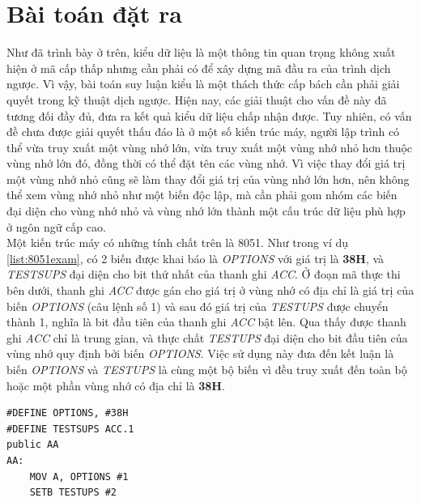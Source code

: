 \section{Bài toán đặt ra}
\label{sec:problem}
Như đã trình bày ở trên, kiểu dữ liệu là một thông tin quan trọng không xuất hiện ở mã cấp thấp nhưng cần phải có để xây dựng mã đầu ra của trình dịch ngược. Vì vậy, bài toán suy luận kiểu là một thách thức cấp bách cần phải giải quyết trong kỹ thuật dịch ngược. Hiện nay, các giải thuật cho vấn đề này đã tương đối đầy đủ, đưa ra kết quả kiểu dữ liệu chấp nhận được. Tuy nhiên, có vấn đề chưa được giải quyết thấu đáo là ở một số kiến trúc máy, người lập trình có thể vừa truy xuất một vùng nhớ lớn, vừa truy xuất một vùng nhớ nhỏ hơn thuộc vùng nhớ lớn đó, đồng thời có thể đặt tên các vùng nhớ. Vì việc thay đổi giá trị một vùng nhớ nhỏ cũng sẽ làm thay đổi giá trị của vùng nhớ lớn hơn, nên không thể xem vùng nhớ nhỏ như một biến độc lập, mà cần phải gom nhóm các biến đại diện cho vùng nhớ nhỏ và vùng nhớ lớn thành một cấu trúc dữ liệu phù hợp ở ngôn ngữ cấp cao. \\

Một kiến trúc máy có những tính chất trên là 8051. Như trong ví dụ \ref{list:8051exam}, có 2 biến được khai báo là \textit{OPTIONS} với giá trị là \textbf{38H}, và \textit{TESTSUPS} đại diện cho bit thứ nhất của thanh ghi \textit{ACC}. Ở đoạn mã thực thi bên dưới, thanh ghi \textit{ACC} được gán cho giá trị ở vùng nhớ có địa chỉ là giá trị của biến \textit{OPTIONS} (câu lệnh số 1) và sau đó giá trị của \textit{TESTUPS} được chuyển thành 1, nghĩa là bit đầu tiên của thanh ghi \textit{ACC} bật lên. Qua thấy được thanh ghi \textit{ACC} chỉ là trung gian, và thực chất \textit{TESTUPS} đại diện cho bit đầu tiên của vùng nhớ quy định bởi biến \textit{OPTIONS}. Việc sử dụng này đưa đến kết luận là biến \textit{OPTIONS} và \textit{TESTUPS} là cùng một bộ biến vì đều truy xuất đến toàn bộ hoặc một phần vùng nhớ có địa chỉ là \textbf{38H}.

\begin{lstlisting}[caption={Một đoạn mã 8051},label={list:8051exam}]
#DEFINE OPTIONS, #38H
#DEFINE TESTSUPS ACC.1
public AA
AA:
	MOV A, OPTIONS #1
	SETB TESTUPS #2
\end{lstlisting}


